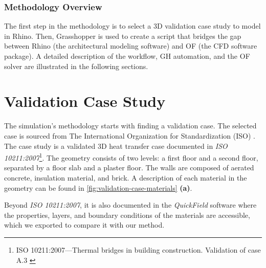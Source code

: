 \subsubsection{Methodology Overview}
The first step in the methodology is to select a 3D validation case study to model in Rhino. Then, Grasshopper is used to create a script that bridges the gap between Rhino (the architectural modeling software) and  \gls{OF} (the CFD software package). A detailed description of the workflow, \gls{GH} automation, and the \gls{OF} solver are illustrated in the following sections.





\section{Validation Case Study}
The simulation's methodology starts with finding a validation case. The selected case is sourced from The International Organization for Standardization (ISO) \cite{ISO}. The case study is a validated 3D heat transfer case documented in \textit{ISO 10211:2007}\footnote{ISO 10211:2007---Thermal bridges in building construction. Validation of case A.3 \cite{ISO}}. 
The geometry consists of two levels: a first floor and a second floor, separated by a floor slab and a plaster floor. The  walls are composed of aerated concrete, insulation material, and brick.
A description of each material in the geometry can be found in \ref{fig:validation-case-materials} \textbf{(a)}.

Beyond \textit{ISO 10211:2007}, it is also documented in the \textit{QuickField} software where the properties, layers, and boundary conditions of the materials are accessible, which we exported to compare it with our method. 

   


